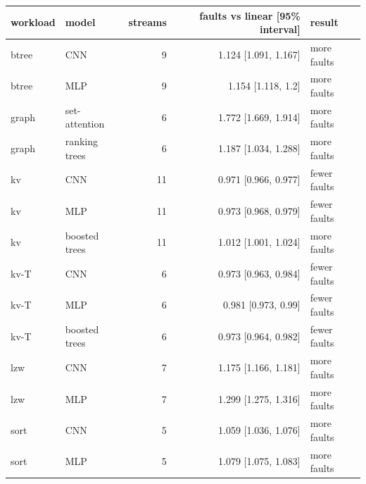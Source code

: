 \begin{tabular}{llrrl}
\toprule
workload & model & streams & faults vs linear [95\% interval] & result \\
\midrule
btree & CNN & 9 & 1.124 [1.091, 1.167] & more faults \\
btree & MLP & 9 & 1.154 [1.118, 1.2] & more faults \\
graph & set-attention & 6 & 1.772 [1.669, 1.914] & more faults \\
graph & ranking trees & 6 & 1.187 [1.034, 1.288] & more faults \\
kv & CNN & 11 & 0.971 [0.966, 0.977] & fewer faults \\
kv & MLP & 11 & 0.973 [0.968, 0.979] & fewer faults \\
kv & boosted trees & 11 & 1.012 [1.001, 1.024] & more faults \\
kv-T & CNN & 6 & 0.973 [0.963, 0.984] & fewer faults \\
kv-T & MLP & 6 & 0.981 [0.973, 0.99] & fewer faults \\
kv-T & boosted trees & 6 & 0.973 [0.964, 0.982] & fewer faults \\
lzw & CNN & 7 & 1.175 [1.166, 1.181] & more faults \\
lzw & MLP & 7 & 1.299 [1.275, 1.316] & more faults \\
sort & CNN & 5 & 1.059 [1.036, 1.076] & more faults \\
sort & MLP & 5 & 1.079 [1.075, 1.083] & more faults \\
\bottomrule
\end{tabular}
